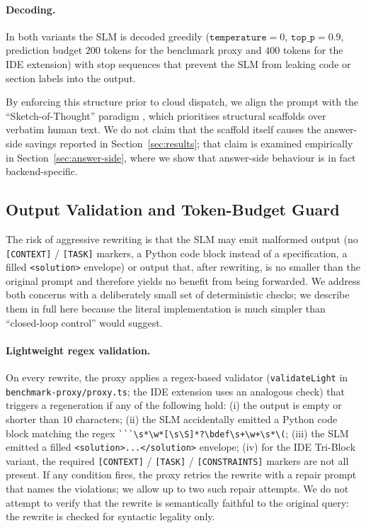\documentclass[11pt,a4paper,twocolumn]{article}
\begin{document}
\paragraph{Decoding.} In both variants the SLM is decoded greedily ($\texttt{temperature} = 0$, $\texttt{top\_p} = 0.9$, prediction budget $200$ tokens for the benchmark proxy and $400$ tokens for the IDE extension) with stop sequences that prevent the SLM from leaking code or section labels into the output.

By enforcing this structure prior to cloud dispatch, we align the prompt with the ``Sketch-of-Thought'' paradigm \cite{ma2025sketch}, which prioritises structural scaffolds over verbatim human text. We do not claim that the scaffold itself causes the answer-side savings reported in Section~\ref{sec:results}; that claim is examined empirically in Section~\ref{sec:answer-side}, where we show that answer-side behaviour is in fact backend-specific.

\subsection{Output Validation and Token-Budget Guard}
\label{sec:guard}
The risk of aggressive rewriting is that the SLM may emit malformed output (no \texttt{[CONTEXT]} / \texttt{[TASK]} markers, a Python code block instead of a specification, a filled \texttt{<solution>} envelope) or output that, after rewriting, is no smaller than the original prompt and therefore yields no benefit from being forwarded. We address both concerns with a deliberately small set of deterministic checks; we describe them in full here because the literal implementation is much simpler than ``closed-loop control'' would suggest.

\paragraph{Lightweight regex validation.} On every rewrite, the proxy applies a regex-based validator (\texttt{validateLight} in \texttt{benchmark-proxy/proxy.ts}; the IDE extension uses an analogous check) that triggers a regeneration if any of the following hold: (i) the output is empty or shorter than $10$ characters; (ii) the SLM accidentally emitted a Python code block matching the regex \verb|```\s*\w*[\s\S]*?\bdef\s+\w+\s*\(|; (iii) the SLM emitted a filled \verb|<solution>...</solution>| envelope; (iv) for the IDE Tri-Block variant, the required \texttt{[CONTEXT]} / \texttt{[TASK]} / \texttt{[CONSTRAINTS]} markers are not all present. If any condition fires, the proxy retries the rewrite with a repair prompt that names the violations; we allow up to two such repair attempts. We do not attempt to verify that the rewrite is semantically faithful to the original query: the rewrite is checked for syntactic legality only.
\end{document}
